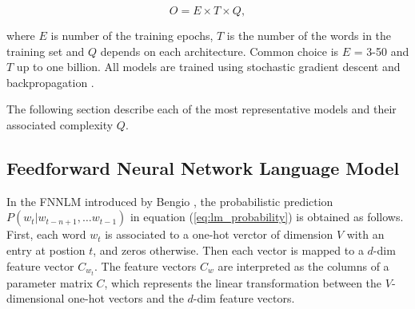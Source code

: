 \begin{center}
\begin{equation} O = E \times T \times Q,   \end{equation}
\end{center}

where $E$ is number of the training epochs, $T$ is the number of the words in
the training set and $Q$ depends on each architecture. Common choice is $E$ = 3-50 and $T$ up to one billion.
All models are trained using stochastic gradient descent and backpropagation
\cite{Bengio:2003:NPL:944919.944966,DBLP:journals/corr/abs-1301-3781}.

The following section describe each of the most representative  models and their
associated complexity $Q$.



\subsection{Feedforward Neural Network Language Model}
\label{subsec:fwd-neural-net-lm}


In the \ac{FNNLM} introduced by Bengio
\cite{Bengio:2003:NPL:944919.944966},  the probabilistic prediction $P(w_t | w_{t-n+1}, \ldots w_{t-1})$ 
in equation (\ref{eq:lm_probability}) is obtained as follows. 
First, each word $w_t$ is associated to a one-hot verctor of dimension $V$ with an entry at postion $t$, and zeros otherwise.  Then each vector is mapped to a $d$-dim feature vector $C_{w_t}$. The feature vectors $C_w$ are interpreted as the columns of a parameter matrix $C$, which represents the linear transformation between the $V$-dimensional one-hot vectors and the $d$-dim feature vectors. 

